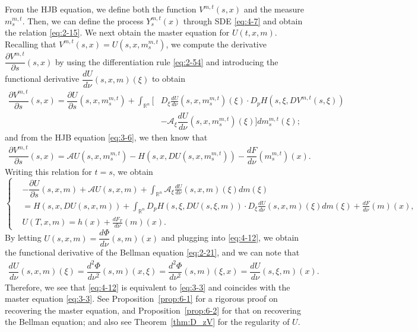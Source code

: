 \documentclass[11pt]{article}
\numberwithin{equation}{section}
\newcommand{\brn}{{\mathbb{R}^n}}
\newcommand{\1}{\mbox{1\hspace{-1mm}I}}
\begin{document}
From the HJB equation, we define both the function $V^{m,t}(s,x)$ and the measure $m^{m,t}_s$. Then, we can define the process $Y^{m,t}_s(x)$ through SDE \eqref{eq:4-7} and obtain the relation \eqref{eq:2-15}. %
We next obtain the master equation for $U(t,x,m)$. Recalling that $V^{m,t}(s,x)=U\left(s,x,m^{m,t}_s\right)$, we compute the derivative $\dfrac{\partial V^{m,t}}{\partial s}(s,x)$ by using the differentiation rule \eqref{eq:2-54} and introducing the functional derivative $\dfrac{dU}{d\nu}(s,x,m)(\xi)$ to obtain 
\begin{align*}
    \dfrac{\partial V^{m,t}}{\partial s}(s,x)=\dfrac{\partial U}{\partial s}\left(s,x,m^{m,t}_s\right)+\int_{\brn}\bigg[&D_{\xi}\frac{dU}{d\nu}\left(s,x,m^{m,t}_s\right)(\xi)\cdot D_p H\left(s,\xi,DV^{m,t}(s,\xi)\right)\\
    &-\mathcal{A}_{\xi}\dfrac{dU}{d\nu}\left(s,x,m^{m,t}_s\right)(\xi)\bigg]dm^{m,t}_s(\xi);
\end{align*}
and from the HJB equation \eqref{eq:3-6}, we then know that
\begin{align*}
    \dfrac{\partial V^{m,t}}{\partial s}(s,x)=\mathcal{A}U\left(s,x,m^{m,t}_s\right)-H\left(s,x,DU\left(s,x,m^{m,t}_s\right)\right)-\dfrac{dF}{d\nu}\left(m^{m,t}_s\right)(x).
\end{align*}
Writing this relation for $t=s$, we obtain
\begin{equation}\label{eq:4-12}
    \left\{
        \begin{aligned}
            &-\dfrac{\partial U}{\partial s}(s,x,m)+\mathcal{A}U(s,x,m)+\int_{\brn}\mathcal{A}_\xi \frac{dU}{d\nu}(s,x,m)(\xi)dm(\xi)\\
            &=H\left(s,x,DU(s,x,m)\right)+\int_{\brn}D_p H\left(s,\xi,DU(s,\xi,m)\right)\cdot D_\xi\frac{dU}{d\nu}(s,x,m)(\xi) dm(\xi)+
            \frac{dF}{d\nu}(m)(x),\\
            &U(T,x,m)=h(x)+\frac{dF_T}{d\nu}(m)(x).
        \end{aligned}
    \right.
\end{equation} 
By letting $U(s,x,m)=\dfrac{d\Phi}{d\nu}(s,m)(x)$ and plugging
into \eqref{eq:4-12}, we obtain the functional derivative of the Bellman equation \eqref{eq:2-21}, and we can note that 
\begin{align*}
    \dfrac{dU}{d\nu}(s,x,m)(\xi)=\dfrac{d^{2}\Phi}{d\nu^{2}}(s,m)(x,\xi)=\dfrac{d^{2}\Phi}{d\nu^{2}}(s,m)(\xi,x)=\dfrac{dU}{d\nu}(s,\xi,m)(x).
\end{align*}
Therefore, we see that \eqref{eq:4-12} is equivalent to \eqref{eq:3-3} and coincides with the master equation \eqref{eq:3-3}. See Proposition~\ref{prop:6-1} for a rigorous proof on recovering the master equation, and Proposition~\ref{prop:6-2} for that on recovering the Bellman equation; and also see Theorem~\ref{thm:D_zV} for the regularity of $U$.
\end{document}
